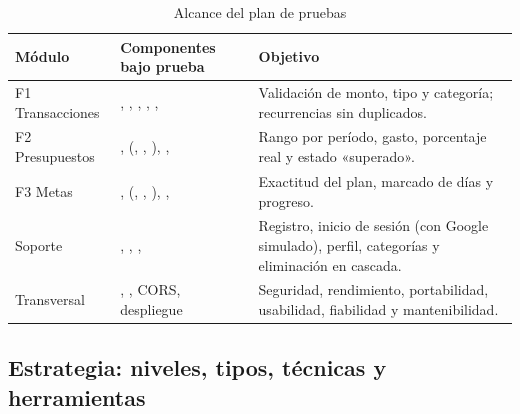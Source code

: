\begin{table}[H]
\caption{Alcance del plan de pruebas}
\label{tab:alcance-pruebas}
\footnotesize
\begin{tabularx}{\linewidth}{L{2.8cm} L{5.4cm} Y}
\toprule
Módulo & Componentes bajo prueba & Objetivo \\
\midrule
F1 Transacciones & , , , , ,  & Validación de monto, tipo y categoría; recurrencias sin duplicados. \\
F2 Presupuestos & ,  (, , ), ,  & Rango por período, gasto, porcentaje real y estado «superado». \\
F3 Metas & ,  (, , ), ,  & Exactitud del plan, marcado de días y progreso. \\
Soporte & , , ,  & Registro, inicio de sesión (con Google simulado), perfil, categorías y eliminación en cascada. \\
Transversal & , , CORS, despliegue & Seguridad, rendimiento, portabilidad, usabilidad, fiabilidad y mantenibilidad. \\
\bottomrule
\end{tabularx}
\end{table}

\subsection{Estrategia: niveles, tipos, técnicas y herramientas}

